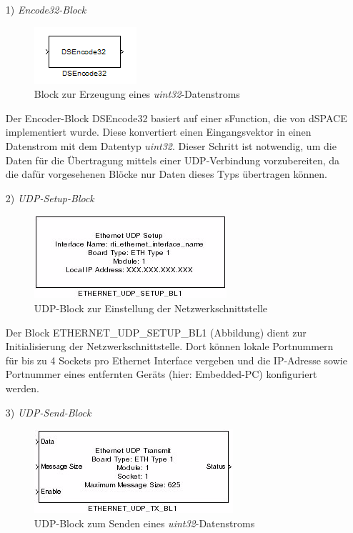 \documentclass[fontsize = 12pt, paper = a4]{scrreprt}
\begin{document}
\begin{itemize}

\item[1)] \textit{Encode32-Block}

\begin{figure}[h]
\centering
\includegraphics[scale = 1]{dsencode32}
\caption{Block zur Erzeugung eines \textit{uint32}-Datenstroms}
\label{DSEncode32-Block}
\end{figure} 

Der Encoder-Block DSEncode32 basiert auf einer sFunction, die von dSPACE implementiert wurde. Diese konvertiert einen Eingangsvektor in einen Datenstrom mit dem Datentyp \textit{uint32}. Dieser Schritt ist notwendig, um die Daten für die Übertragung mittels einer UDP-Verbindung vorzubereiten, da die dafür vorgesehenen Blöcke nur Daten dieses Typs übertragen können. 

\item[2)] \textit{UDP-Setup-Block} 

\begin{figure}[h]
\centering
\includegraphics[scale = 1]{ethernet_udp_setup_block}
\caption{UDP-Block zur Einstellung der Netzwerkschnittstelle}
\end{figure}

Der Block ETHERNET\_UDP\_SETUP\_BL1 (\*Abbildung\*) dient zur Initialisierung der Netzwerkschnittstelle. Dort können lokale Portnummern für bis zu 4 Sockets pro Ethernet Interface vergeben und die IP-Adresse sowie Portnummer eines entfernten Geräts (hier: Embedded-PC) konfiguriert werden.

\newpage

\item[3)] \textit{UDP-Send-Block}

\begin{figure}[h]
\centering
\includegraphics[scale = 1]{ethernet_udp_send_block.png}
\caption{UDP-Block zum Senden eines \textit{uint32}-Datenstroms}
\end{figure}


\end{itemize}
\end{document}
